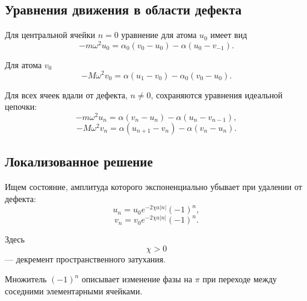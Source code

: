 \documentclass[../final.tex]{subfiles}
\begin{document}
\solution

\subsection*{Уравнения движения в области дефекта}

Для центральной ячейки $n=0$
уравнение для атома $u_0$ имеет вид
%
\begin{equation*}
    -m\omega^2u_0
    =
    \alpha_0(v_0-u_0)
    -
    \alpha(u_0-v_{-1}).
\end{equation*}
%

Для атома $v_0$
%
\begin{equation*}
    -M\omega^2v_0
    =
    \alpha(u_1-v_0)
    -
    \alpha_0(v_0-u_0).
\end{equation*}
%

Для всех ячеек вдали от дефекта,
$n\neq0$,
сохраняются уравнения идеальной цепочки:
%
\begin{equation*}
    -m\omega^2u_n
    =
    \alpha(v_n-u_n)
    -
    \alpha(u_n-v_{n-1}),
\end{equation*}
%
\begin{equation*}
    -M\omega^2v_n
    =
    \alpha(u_{n+1}-v_n)
    -
    \alpha(v_n-u_n).
\end{equation*}



\subsection*{Локализованное решение}

Ищем состояние,
амплитуда которого экспоненциально убывает
при удалении от дефекта:
%
\begin{equation*}
    u_n
    =
    u_0
    e^{-2\chi a|n|}
    (-1)^n,
\end{equation*}
%
\begin{equation*}
    v_n
    =
    v_0
    e^{-2\chi a|n|}
    (-1)^n.
\end{equation*}
%

Здесь
%
\begin{equation*}
    \chi>0
\end{equation*}
%
--- декремент пространственного затухания.

Множитель $(-1)^n$ описывает изменение фазы
на $\pi$ при переходе между соседними элементарными ячейками.
\end{document}
